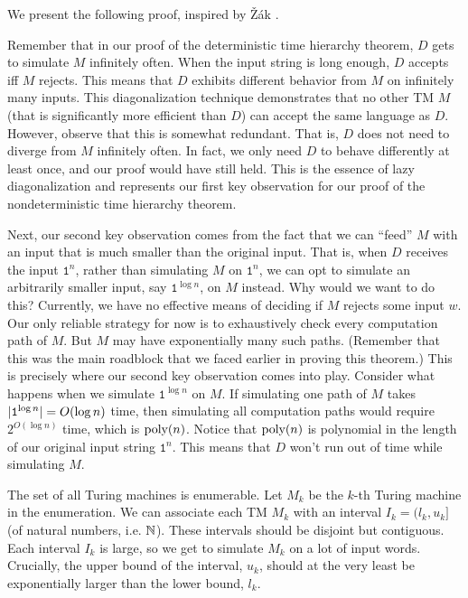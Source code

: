 \documentclass[11pt,twoside=off,numbers=noenddot]{scrbook}
\begin{document}
We present the following proof, inspired by Žák \cite{zak1983turing}.

\begin{proofidea}
  Remember that in our proof of the deterministic time hierarchy theorem, $D$ gets to simulate $M$ infinitely often. When the input string is long enough, $D$ accepts iff $M$ rejects. This means that $D$ exhibits different behavior from $M$ on infinitely many inputs. This diagonalization technique demonstrates that no other TM $M$ (that is significantly more efficient than $D$) can accept the same language as $D$. However, observe that this is somewhat redundant. That is, $D$ does not need to diverge from $M$ infinitely often. In fact, we only need $D$ to behave differently at least once, and our proof would have still held. This is the essence of lazy diagonalization and represents our first key observation for our proof of the nondeterministic time hierarchy theorem.

  Next, our second key observation comes from the fact that we can ``feed'' $M$ with an input that is much smaller than the original input. That is, when $D$ receives the input $\texttt{1}^n$, rather than simulating $M$ on $\texttt{1}^n$, we can opt to simulate an arbitrarily smaller input, say $\texttt{1}^{\log n}$, on $M$ instead. Why would we want to do this? Currently, we have no effective means of deciding if $M$ rejects some input $w$. Our only reliable strategy for now is to exhaustively check every computation path of $M$. But $M$ may have exponentially many such paths. (Remember that this was the main roadblock that we faced earlier in proving this theorem.) This is precisely where our second key observation comes into play. Consider what happens when we simulate $\texttt{1}^{\log n}$ on $M$. If simulating one path of $M$ takes $| \texttt{1}^{\log n} | = O(\log n)$ time, then simulating all computation paths would require $2^{O(\log n)}$ time, which is $\text{poly}(n)$. Notice that $\text{poly}(n)$ is polynomial in the length of our original input string $\texttt{1}^n$. This means that $D$ won't run out of time while simulating $M$.

  The set of all Turing machines is enumerable. Let $M_k$ be the $k$-th Turing machine in the enumeration. We can associate each TM $M_k$ with an interval $I_k = (l_k, u_k]$ (of natural numbers, i.e. $\mathbb N$). These intervals should be disjoint but contiguous. Each interval $I_k$ is large, so we get to simulate $M_k$ on a lot of input words. Crucially, the upper bound of the interval, $u_k$, should at the very least be exponentially larger than the lower bound, $l_k$.


\end{proofidea}
\end{document}
